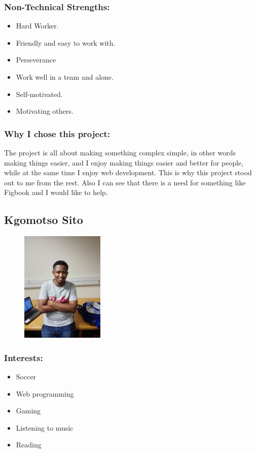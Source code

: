 \subsubsection{Non-Technical Strengths:}
	\begin{itemize}
		\item Hard Worker.
		\item Friendly and easy to work with.
		\item Perseverance
		\item Work well in a team and alone.
		\item Self-motivated.
		\item Motivating others.
	\end{itemize}

\subsubsection{Why I chose this project:}
	\par{The project is all about making something complex simple, in other words making things easier, and I enjoy making things easier and better for people, while at the same time I enjoy web development. This is why this project stood out to me from the rest. Also I can see that there is a need for something like Figbook and I would like to help.}

\newpage
\subsection{Kgomotso Sito}
\begin{figure}[h]
			\center
			\includegraphics[height=200px]{images/Kgomotso.jpg}
\end{figure}
\subsubsection{Interests:}
	\begin{itemize}
		\item Soccer
		\item Web programming
		\item Gaming
		\item Listening to music 
		\item Reading 
	\end{itemize}

